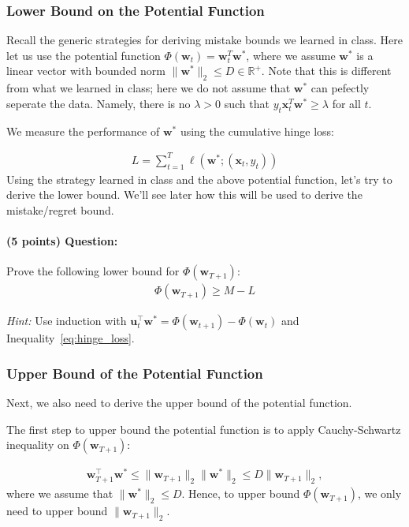 \documentclass{article}
\begin{document}
\subsubsection{Lower Bound on the Potential Function}

Recall the generic strategies for deriving mistake bounds we learned in class.
Here let us use the potential function $\Phi(\mathbf{w}_{t}) = \mathbf{w}_t^T \mathbf{w}^*$, where we assume $\mathbf{w}^*$ is a linear vector with bounded norm $\|\mathbf{w}^*\|_2 \leq D\in\mathbb{R}^+$. Note that this is different from what we learned in class; here we do not assume that $\mathbf{w}^*$ can pefectly seperate the data. Namely, there is no $\lambda > 0$ such that $y_t\mathbf{x}_t^T \mathbf{w}^*\geq \lambda$ for all $t$.

We measure the performance of $\mathbf{w}^*$ using the cumulative hinge loss: 

\begin{align}
    L = \sum_{t=1}^T \ell(\mathbf{w}^*; (\mathbf{x}_t,y_t))
\end{align}
Using the strategy learned in class and the above potential function, let's try to derive the lower bound. We'll see later how this will be used to derive the mistake/regret bound.

\paragraph{(5 points) Question:}

Prove the following lower bound for $\Phi(\mathbf{w}_{T+1})$:
\begin{align}
    \Phi(\mathbf{w}_{T+1}) \geq M - L
\end{align}

\textit{Hint:} Use induction with $\mathbf{u}_t^{\top}\mathbf{w}^* = \Phi(\mathbf{w}_{t+1}) - \Phi(\mathbf{w}_t)$ and Inequality~\ref{eq:hinge_loss}.

\subsubsection{Upper Bound of the Potential Function}
Next, we also need to derive the upper bound of the potential function.

The first step to upper bound the potential function is to apply Cauchy-Schwartz inequality on $\Phi(\mathbf{w}_{T+1})$:

\begin{align}
    \mathbf{w}_{T+1}^{\top}\mathbf{w}^* \leq \|\mathbf{w}_{T+1}\|_2\|\mathbf{w}^*\|_2 \leq D \|\mathbf{w}_{T+1}\|_2,
\end{align}
where we assume that $\|\mathbf{w}^*\|_2\leq D$. Hence, to upper bound $\Phi(\mathbf{w}_{T+1})$, we only need to upper bound $\|\mathbf{w}_{T+1}\|_2$. 
\end{document}
